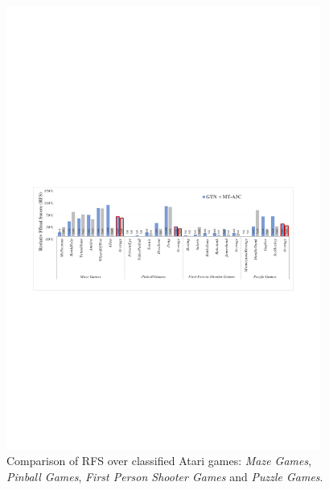 \documentclass[letterpaper]{article} %
\begin{document}
\begin{figure}[htb]
	\begin{center}
		\centerline{\includegraphics[width=0.92\textwidth]{figure/figure-resn-2}}
		\caption{
                Comparison of RFS over classified Atari games: \textit{Maze Games}, \textit{Pinball Games}, \textit{First Person Shooter Games} and \textit{Puzzle Games}.
            }
		\label{figure-resn-2}
	\end{center}
\end{figure}
\end{document}
